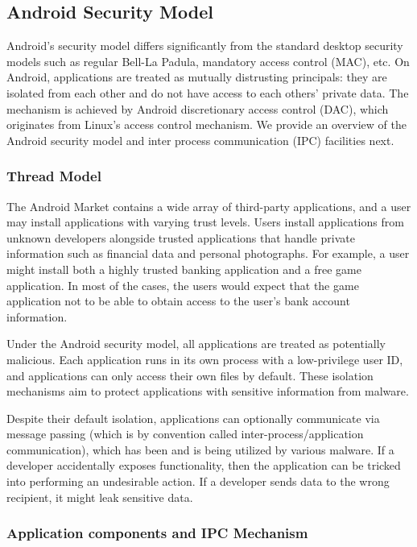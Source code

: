 \subsection{Android Security Model}
Android's security model differs significantly from the standard desktop security models such as regular Bell-La Padula, mandatory access control (MAC), etc. On Android, applications are treated as mutually distrusting principals: they are isolated from each other and do not have access to each others' private data. The mechanism is achieved by Android discretionary access control (DAC), which originates from Linux's access control mechanism. We provide an overview of the Android security model and inter process communication (IPC) facilities next.

\subsubsection{Thread Model}

The Android Market contains a wide array of third-party applications, and a user may install applications with varying trust levels. Users install applications from unknown developers alongside trusted applications that handle private information such as financial data and personal photographs. For example, a user might install both a highly trusted banking application and a free game application. In most of the cases, the users would expect that the game application not to be able to obtain access to the user's bank account information.

Under the Android security model, all applications are treated as potentially malicious. Each application runs in its own process with a low-privilege user ID, and applications can only access their own files by default. These isolation mechanisms aim to protect applications with sensitive information from malware.

Despite their default isolation, applications can optionally communicate via message passing (which is by convention called inter-process/application communication), which has been and is being utilized by various malware. If a developer accidentally exposes functionality, then the application can be tricked into performing an undesirable action. If a developer sends data to the wrong recipient, it might leak sensitive data.

\subsubsection{Application components and IPC Mechanism}

